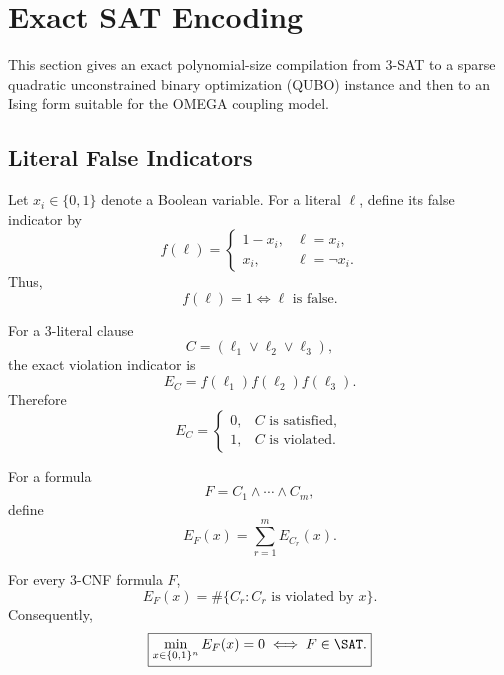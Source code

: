 \section{Exact SAT Encoding}
\label{sec:exact-sat-encoding}

This section gives an exact polynomial-size compilation from 3-SAT to a sparse
quadratic unconstrained binary optimization (QUBO) instance and then to an
Ising form suitable for the OMEGA coupling model.

\subsection{Literal False Indicators}

Let $x_i\in\{0,1\}$ denote a Boolean variable. For a literal $\ell$, define its
false indicator by
\begin{equation}
f(\ell)=
\begin{cases}
1-x_i, & \ell=x_i,\\
x_i, & \ell=\neg x_i.
\end{cases}
\end{equation}
Thus,
\begin{equation}
f(\ell)=1
\iff
\ell \text{ is false}.
\end{equation}

For a 3-literal clause
\begin{equation}
C=(\ell_1\lor \ell_2\lor \ell_3),
\end{equation}
the exact violation indicator is
\begin{equation}
E_C
=
f(\ell_1)f(\ell_2)f(\ell_3).
\end{equation}
Therefore
\begin{equation}
E_C=
\begin{cases}
0,& C\text{ is satisfied},\\
1,& C\text{ is violated}.
\end{cases}
\end{equation}

For a formula
\begin{equation}
F=C_1\land\cdots\land C_m,
\end{equation}
define
\begin{equation}
E_F(x)
=
\sum_{r=1}^{m}E_{C_r}(x).
\end{equation}

\begin{theorem}
\label{thm:exact-clause-energy}
For every 3-CNF formula $F$,
\begin{equation}
E_F(x)
=
\#\{C_r:C_r\text{ is violated by }x\}.
\end{equation}
Consequently,
\begin{equation}
\boxed{
\min_{x\in\{0,1\}^n}E_F(x)=0
\iff
F\in\SAT.
}
\end{equation}
\end{theorem}


